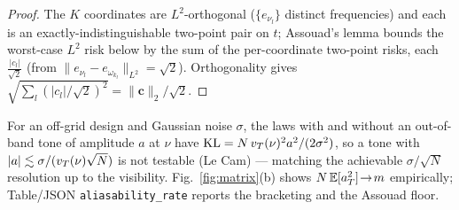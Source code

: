 \begin{proof}
The $K$ coordinates are $L^2$-orthogonal ($\{e_{\nu_l}\}$ distinct frequencies) and each is an
exactly-indistinguishable two-point pair on $t$; Assouad's lemma
\cite[Ch.~2]{tsybakov2009nonparametric} bounds the worst-case $L^2$ risk below by the sum of the
per-coordinate two-point risks, each $\tfrac{|c_l|}{\sqrt2}$ (from $\lVert e_{\nu_l}-e_{\omega_{k_l}}
\rVert_{L^2}=\sqrt2$).  Orthogonality gives $\sqrt{\sum_l(|c_l|/\sqrt2)^2}=\lVert\bm c\rVert_2/
\sqrt2$.
\end{proof}

\begin{remark}\label{rmk:u3a-lecam}
For an off-grid design and Gaussian noise $\sigma$, the laws with and without an out-of-band tone
of amplitude $a$ at $\nu$ have $\mathrm{KL}=N\,v_T(\nu)^2a^2/(2\sigma^2)$, so a tone with
$|a|\lesssim\sigma/(v_T(\nu)\sqrt N)$ is not testable (Le Cam) --- matching the achievable
$\sigma/\sqrt N$ resolution up to the visibility.  Fig.~\ref{fig:matrix}(b) shows
$N\,\mathbb E[a_T^2]\!\to\!m$ empirically; Table/JSON \texttt{aliasability\_rate} reports the
bracketing and the Assouad floor.
\end{remark}
